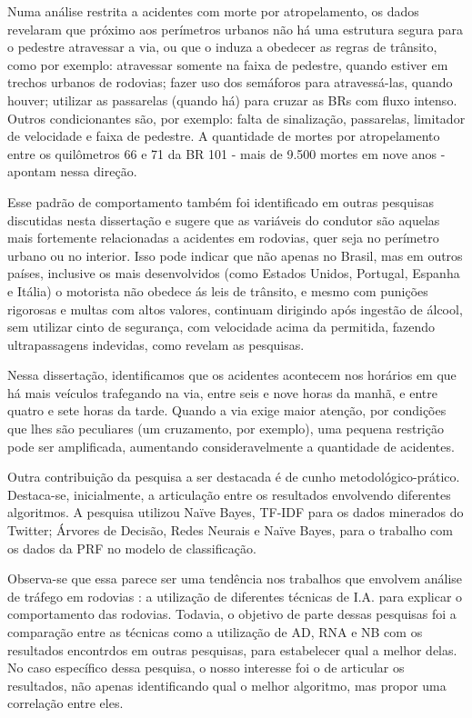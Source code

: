 Numa análise restrita a acidentes com morte por atropelamento, os dados revelaram que próximo aos perímetros urbanos não há uma estrutura segura para o pedestre atravessar a via, ou que o induza a obedecer as regras de trânsito, como por exemplo: atravessar somente na faixa de pedestre, quando estiver em trechos urbanos de rodovias; fazer uso dos semáforos para atravessá-las, quando houver; utilizar as passarelas (quando há) para cruzar as BRs com fluxo intenso. Outros condicionantes são, por exemplo: falta de sinalização, passarelas, limitador de velocidade e faixa de pedestre. A quantidade de mortes por atropelamento entre os quilômetros 66 e 71 da BR 101 - mais de 9.500 mortes em nove anos - apontam nessa direção.

Esse padrão de comportamento também foi identificado em outras pesquisas discutidas nesta dissertação e sugere que as variáveis do condutor são aquelas mais fortemente relacionadas a acidentes em rodovias, quer seja no perímetro urbano ou no interior. Isso pode indicar que não apenas no Brasil, mas em outros países, inclusive os mais desenvolvidos (como Estados Unidos, Portugal, Espanha e Itália) o motorista não obedece ás leis de trânsito, e mesmo com punições rigorosas e multas com altos valores, continuam dirigindo após ingestão de álcool, sem utilizar cinto de segurança, com velocidade acima da permitida, fazendo ultrapassagens indevidas, como revelam as pesquisas.
 
Nessa dissertação, identificamos que os acidentes acontecem nos horários em que há mais veículos trafegando na via, entre seis e nove horas da manhã, e entre quatro e sete horas da tarde. Quando a via exige maior atenção, por condições que lhes são peculiares (um cruzamento, por exemplo), uma pequena restrição pode ser amplificada, aumentando consideravelmente a quantidade de acidentes.

Outra contribuição da pesquisa a ser destacada é de cunho metodológico-prático. Destaca-se, inicialmente, a articulação entre os resultados envolvendo diferentes algoritmos. A pesquisa utilizou Naïve Bayes, TF-IDF para os dados minerados do Twitter; 
Árvores de Decisão, Redes Neurais e  Naïve Bayes, para o trabalho com os dados da PRF no modelo de classificação.

Observa-se que essa parece ser uma tendência nos trabalhos que envolvem análise de tráfego em rodovias \cite{beshah2010mining} \cite{olutayo2014traffic} \cite{thianniwet2010classification} \cite{de2015comparison} \cite{Bernardini}: a utilização de diferentes técnicas de I.A. para explicar o comportamento das rodovias. Todavia, o objetivo de parte dessas pesquisas foi a comparação entre as técnicas como a utilização de AD, RNA e NB com os resultados encontrdos em outras pesquisas, para estabelecer qual a melhor delas. No caso específico dessa pesquisa, o nosso interesse foi o de articular os resultados, não apenas identificando qual o melhor algoritmo, mas propor uma correlação entre eles.

